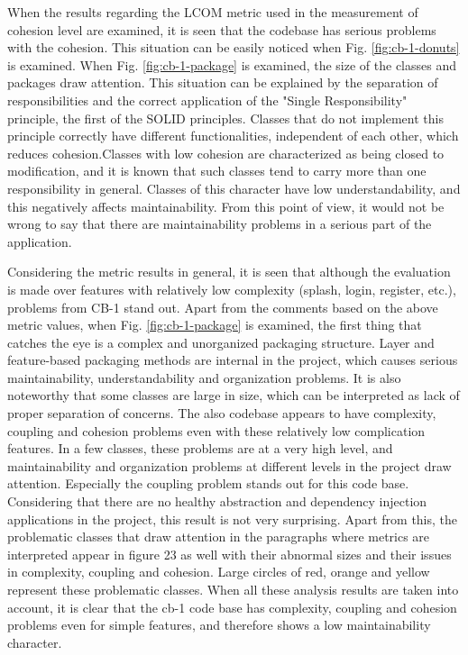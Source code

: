 When the results regarding the LCOM metric used in the measurement of cohesion level are examined, it is seen that the codebase has serious problems with the cohesion. This situation can be easily noticed when Fig. \ref{fig:cb-1-donuts} is examined. When Fig. \ref{fig:cb-1-package} is examined, the size of the classes and packages draw attention. This situation can be explained by the separation of responsibilities and the correct application of the "Single Responsibility" principle, the first of the SOLID principles. Classes that do not implement this principle correctly have different functionalities, independent of each other, which reduces cohesion.Classes with low cohesion are characterized as being closed to modification, and it is known that such classes tend to carry more than one responsibility in general. Classes of this character have low understandability, and this negatively affects maintainability. From this point of view, it would not be wrong to say that there are maintainability problems in a serious part of the application.

Considering the metric results in general, it is seen that although the evaluation is made over features with relatively low complexity (splash, login, register, etc.), problems from CB-1 stand out. Apart from the comments based on the above metric values, when Fig. \ref{fig:cb-1-package} is examined, the first thing that catches the eye is a complex and unorganized packaging structure. Layer and feature-based packaging methods are internal in the project, which causes serious maintainability, understandability and organization problems. It is also noteworthy that some classes are large in size, which can be interpreted as lack of proper separation of concerns. The also codebase appears to have complexity, coupling and cohesion problems even with these relatively low complication features. In a few classes, these problems are at a very high level, and maintainability and organization problems at different levels in the project draw attention. Especially the coupling problem stands out for this code base. Considering that there are no healthy abstraction and dependency injection applications in the project, this result is not very surprising. Apart from this, the problematic classes that draw attention in the paragraphs where metrics are interpreted appear in figure 23 as well with their abnormal sizes and their issues in complexity, coupling and cohesion. Large circles of red, orange and yellow represent these problematic classes. When all these analysis results are taken into account, it is clear that the cb-1 code base has complexity, coupling and cohesion problems even for simple features, and therefore shows a low maintainability character.